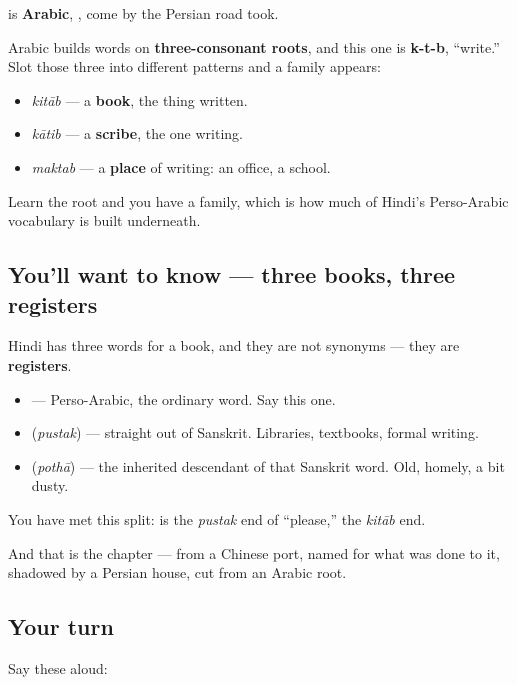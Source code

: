 \begin{cousinweb}
\textbf{} is \textbf{Arabic}, \textbf{}, come by the Persian road \textbf{} took.

Arabic builds words on \textbf{three-consonant roots}, and this one is \textbf{k-t-b}, \textquotedblleft{}write.\textquotedblright{} Slot those three into different patterns and a family appears:

\begin{itemize}
\raggedright
  \item \textbf{} \emph{kitāb} — a \textbf{book}, the thing written.
  \item \textbf{} \emph{kātib} — a \textbf{scribe}, the one writing.
  \item \textbf{} \emph{maktab} — a \textbf{place} of writing: an office, a school.
\end{itemize}

Learn the root and you have a family, which is how much of Hindi's Perso-Arabic vocabulary is built underneath.
\end{cousinweb}

\subsection*{You'll want to know — three books, three registers}
Hindi has three words for a book, and they are not synonyms — they are \textbf{registers}.

\begin{itemize}
\raggedright
  \item \textbf{} — Perso-Arabic, the ordinary word. Say this one.
  \item \textbf{} (\emph{pustak}) — straight out of Sanskrit. Libraries, textbooks, formal writing.
  \item \textbf{} (\emph{pothā}) — the inherited descendant of that Sanskrit word. Old, homely, a bit dusty.
\end{itemize}

You have met this split: \textbf{} is the \emph{pustak} end of \textquotedblleft{}please,\textquotedblright{} \textbf{} the \emph{kitāb} end.

And that is the chapter — \textbf{} from a Chinese port, \textbf{} named for what was done to it, \textbf{} shadowed by a Persian house, \textbf{} cut from an Arabic root.

\subsection*{Your turn}
Say these aloud:

